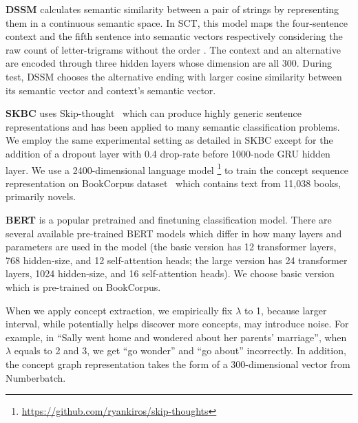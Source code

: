 \textbf{DSSM} calculates semantic similarity 
between a pair of strings by representing them in a continuous semantic space.
In SCT, this model maps the four-sentence context and 
the fifth sentence into semantic vectors respectively considering the raw count of letter-trigrams without the order .
The context and an alternative are encoded through three hidden layers whose dimension are all 300. 
During test, DSSM chooses the alternative 
ending with larger cosine similarity between its semantic vector and context's semantic vector.

\textbf{SKBC} uses Skip-thought~\cite{kiros2015skip} which 
can produce highly generic sentence representations and has been applied to many semantic classification problems.
We employ the same experimental 
setting as detailed in SKBC 
except for the addition of a dropout layer with 0.4 drop-rate before 1000-node GRU hidden layer. 
We use a 2400-dimensional language model
\footnote{\url{https://github.com/ryankiros/skip-thoughts}} 
to train the concept sequence representation 
on BookCorpus dataset~\cite{zhu2015aligning} which contains text from
11,038 books, primarily novels.


\textbf{BERT} 
is a popular pretrained and finetuning classification model. 
There are several available pre-trained BERT models which differ in how many
layers and parameters are used in the model (the basic version has 12 transformer layers, 768 hidden-size, and 12
self-attention heads; the large version has 24 transformer layers, 1024 hidden-size, and
16 self-attention heads). We choose basic version which is pre-trained on BookCorpus.

When we apply concept extraction, we empirically fix $\lambda$ to 1, 
because larger interval, while potentially helps discover more
concepts, may introduce noise. 
For example, in 
``Sally went home and wondered about her parents' marriage'', 
when $\lambda$ equals to 2 and 3, we get ``go wonder'' and 
``go about'' incorrectly.
In addition, the concept graph representation takes the form of a 
300-dimensional vector from Numberbatch. 

